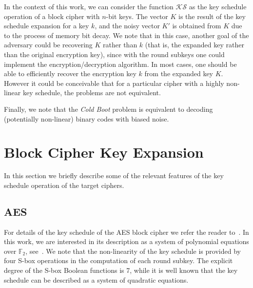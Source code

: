 \documentclass{llncs}
\newcommand{\coldboot}{\emph{Cold Boot}\xspace}
\newcommand{\field}[1]{\mathbb{#1}}
\begin{document}
In the context of this work, we can consider the function $\mathcal{KS}$ as the key schedule operation of a block cipher with $n$-bit keys. The vector $K$ is the result of the key schedule expansion for a key $k$, and the noisy vector $K'$ is obtained from $K$ due to the process of memory bit decay.
We note that in this case, another goal of the adversary could be recovering $K$ rather than $k$ (that is, the expanded key rather than the original encryption key), since with the round subkeys one could implement the encryption/decryption algorithm. In most cases, one should be able to efficiently recover the encryption key $k$ from the expanded key $K$. However it could be conceivable that for a particular cipher with a highly non-linear key schedule, the problems are not equivalent.
 
Finally, we note that the \coldboot problem is equivalent to decoding (potentially non-linear) binary codes with biased noise.

\section{Block Cipher Key Expansion}

In this section we briefly describe some of the relevant features of the key schedule operation of the target ciphers.

\subsection{AES}
For details of the key schedule of the AES block cipher we refer the reader to~\cite{daemen-rijmen-book}. 
In this work, we are interested in its description as a system of polynomial equations over $\field{F}_2$, see~\cite{cid-murphy-robshaw-book}.
We note that the non-linearity of the key schedule is provided by four S-box operations in the computation of each round subkey.
The explicit degree of the S-box Boolean functions is 7, while it is well known that the key schedule can be described as a system of quadratic equations. 
\end{document}
